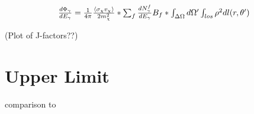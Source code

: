 
\begin{equation} \label{eqn:jfactor}
$$ \frac{d \Phi_{\gamma}}{d E_{\gamma}} = \frac{1}{4\pi} \frac{ \langle \sigma_{\chi} v_{\chi} \rangle }{2 m^{2}_{\chi}} * \sum_{f} \frac{ d N_{\gamma}^{f} }{d E_{\gamma} } B_{f} * \int_{ \Delta \Omega } d \Omega' \int_{los} \rho^{2} d l( r, \theta' )  $$
\end{equation}


(Plot of J-factors??)


\section{Upper Limit}

comparison to 

